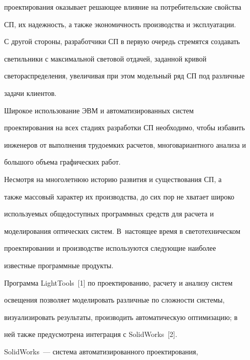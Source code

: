 проектирования оказывает решающее влияние на потребительские свойства 


СП, их надежность, а также экономичность производства и эксплуатации.


  


  С другой стороны, разработчики СП в первую очередь стремятся создавать 


светильники с максимальной световой отдачей, заданной кривой 


светораспределения, увеличивая при этом модельный ряд СП под различные 


задачи клиентов.


  


  Широкое использование ЭВМ и автоматизированных сис\-тем 


проектирования на всех стадиях разработки СП необходимо, чтобы избавить 


инженеров от выполнения трудоемких расчетов, многовариантного анализа и 


большого объема графических работ.


  


  Несмотря на многолетнюю историю развития и существования СП, а 


также массовый характер их производства, до сих пор не хватает широко 


используемых общедоступных программных средств для расчета и 


моделирования оптических сис\-тем. В~настоящее время в светотехническом 


проектировании и производстве используются следующие наиболее 


известные программные продукты.


  


  Программа LightTools~[1] по проектированию, расчету и анализу сис\-тем 


освещения позволяет моделировать различные по сложности сис\-те\-мы, 


визуализировать результаты, производить автоматическую оптимизацию; в 


ней также предусмотрена интеграция с SolidWorks~[2].


  


  SolidWorks~--- система автоматизированного проектирования, 


